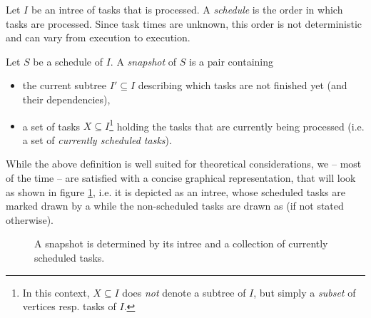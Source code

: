 \begin{definition}  
  Let $I$ be an intree of tasks that is processed. A \emph{schedule} is the order in which tasks are processed. Since task times are unknown, this order is not deterministic and can vary from execution to execution.

  Let $S$ be a schedule of $I$.
  A \emph{snapshot} of $S$ is a pair containing
  \begin{itemize}
  \item the current subtree $I'\subseteq I$ describing which tasks are not finished yet (and their dependencies),
  \item a set of tasks $X \subseteq I$\footnote{In this context, $X\subseteq I$ does \emph{not} denote a subtree of $I$, but simply a \emph{subset} of vertices resp. tasks of $I$.} holding the tasks that are currently being processed (i.e. a set of \emph{currently scheduled tasks}).
  \end{itemize}
\end{definition}

While the above definition is well suited for theoretical considerations, we -- most of the time -- are satisfied with a concise graphical representation, that will look as shown in figure \ref{fig:intro-snapshot-graphical-representation}, i.e. it is depicted as an intree, whose scheduled tasks are marked drawn by a 
while the non-scheduled tasks are drawn as
(if not stated otherwise).

\begin{figure}[t]
  \centering
  \caption{A snapshot is determined by its intree and a collection of currently scheduled tasks.}
  \label{fig:intro-snapshot-graphical-representation}
\end{figure}

